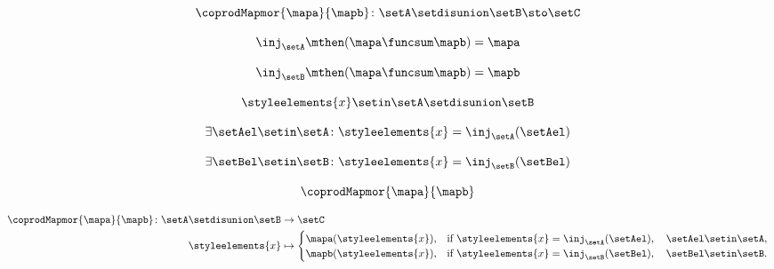 {\begin{forslides}
        \begin{equation}
            \label{eq:feedback-100}
            \coprodMapmor{\mapa}{\mapb}\colon \setA \setdisunion \setB \sto \setC
        \end{equation}

        \begin{equation}
            \label{eq:feedback-101}
            \inj_\setA\mthen (\mapa \funcsum \mapb)=\mapa
        \end{equation}

        \begin{equation}
            \label{eq:feedback-102}
            \inj_\setB\mthen (\mapa \funcsum \mapb)=\mapb
        \end{equation}

        \begin{equation}
            \label{eq:feedback-103}
            \styleelements{x}\setin \setA \setdisunion \setB
        \end{equation}

        \begin{equation}
            \label{eq:feedback-104}
            \exists \setAel\setin \setA\colon \styleelements{x}=\inj_\setA(\setAel)
        \end{equation}

        \begin{equation}
            \label{eq:feedback-105}
            \exists \setBel\setin \setB\colon \styleelements{x}=\inj_\setB(\setBel)
        \end{equation}

        \begin{equation}
            \label{eq:feedback-106}
            \coprodMapmor{\mapa}{\mapb}
        \end{equation}

        \begin{equation}
            \label{eq:feedback-107}
            \begin{aligned}
                \coprodMapmor{\mapa}{\mapb} \colon  \setA \setdisunion \setB & \to \setC \\
                \styleelements{x}                                            & \mapsto
                \begin{cases}
                    \mapa(\styleelements{x}), & \text{if } \styleelements{x}=\inj_\setA(\setAel),\quad \setAel \setin \setA, \\
                    \mapb(\styleelements{x}), & \text{if } \styleelements{x}=\inj_\setB(\setBel),\quad \setBel \setin \setB.
                \end{cases}
            \end{aligned}
        \end{equation}


\end{forslides}}
